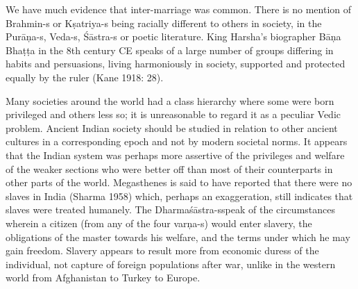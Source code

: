We have much evidence that inter-marriage was common. There is no mention of Brahmin-s or Kṣatriya-s being racially different to others in society, in the Purāņa-s, Veda-s, Śāstra-s or poetic literature. King Harsha’s biographer Bāņa Bhaṭṭa in the 8th century CE speaks of a large number of groups differing in habits and persuasions, living harmoniously in society, supported and protected equally by the ruler (Kane 1918: 28).

Many societies around the world had a class hierarchy where some were born privileged and others less so; it is unreasonable to regard it as a peculiar Vedic problem. Ancient Indian society should be studied in relation to other ancient cultures in a corresponding epoch and not by modern societal norms. It appears that the Indian system was perhaps more assertive of the privileges and welfare of the weaker sections who were better off than most of their counterparts in other parts of the world. Megasthenes is said to have reported that there were no slaves in India (Sharma 1958) which, perhaps an exaggeration, still indicates that slaves were treated humanely. The Dharmaśāstra-s\break speak of the circumstances wherein a citizen (from any of the four varņa-s) would enter slavery, the obligations of the master towards his welfare, and the terms under which he may gain freedom. Slavery appears to result more from economic duress of the individual, not capture of foreign populations after war, unlike in the western world from Afghanistan to Turkey to Europe.

